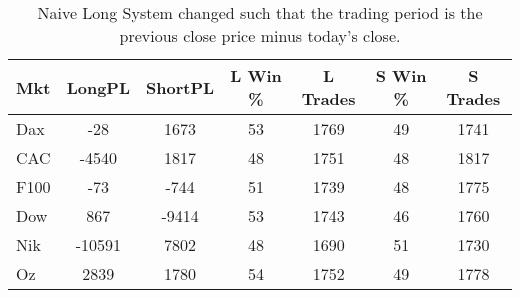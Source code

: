 \begin{table}[ht]
\centering
\caption[Naive Long System - Close to Close]{Naive Long System changed such that the trading period is the previous close price minus today's close.} 
\label{tab:stoch_results}
\begin{tabular}{lcccccc}
  \toprule Mkt & LongPL & ShortPL & L Win \% & L Trades & S Win \% & S Trades \\ 
  \midrule Dax & -28 & 1673 & 53 & 1769 & 49 & 1741 \\ 
  CAC & -4540 & 1817 & 48 & 1751 & 48 & 1817 \\ 
  F100 & -73 & -744 & 51 & 1739 & 48 & 1775 \\ 
  Dow & 867 & -9414 & 53 & 1743 & 46 & 1760 \\ 
  Nik & -10591 & 7802 & 48 & 1690 & 51 & 1730 \\ 
  Oz & 2839 & 1780 & 54 & 1752 & 49 & 1778 \\ 
   \bottomrule \end{tabular}
\end{table}
